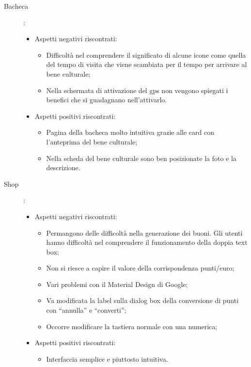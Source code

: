 \documentclass{article}
\begin{document}
\begin{description}
\item [Bacheca] :
\begin{itemize}
	\item Aspetti negativi riscontrati:
		\begin{itemize}
		\item Difficoltà nel comprendere il significato di alcune icone come quella del tempo di visita che viene scambiata per il tempo per arrivare al bene culturale;
		\item Nella schermata di attivazione del gps non vengono spiegati i benefici che si guadagnano nell’attivarlo.
        \end{itemize}
	\item Aspetti positivi riscontrati:
		\begin{itemize}
        \item Pagina della bacheca molto intuitiva grazie alle card con l’anteprima del bene culturale;
        \item Nella scheda del bene culturale sono ben posizionate la foto e la descrizione.
        \end{itemize}
	\end{itemize}
\item [Shop] :
\begin{itemize}
	\item Aspetti negativi riscontrati:
		\begin{itemize}
		\item Permangono delle difficoltà nella generazione dei buoni. Gli utenti hanno difficoltà nel comprendere il funzionamento della doppia text box;
		\item Non si riesce a capire il valore della corrispondenza punti/euro;
		\item Vari problemi con il Material Design di Google;
		\item Va modificata la label sulla dialog box della conversione di punti con “annulla” e “converti”;
		\item Occorre modificare la tastiera normale con una numerica;
        \end{itemize}
	\item Aspetti positivi riscontrati:
		\begin{itemize}
        \item Interfaccia semplice e piuttosto intuitiva.
        \end{itemize}
	\end{itemize}
\end{description}
\end{document}
